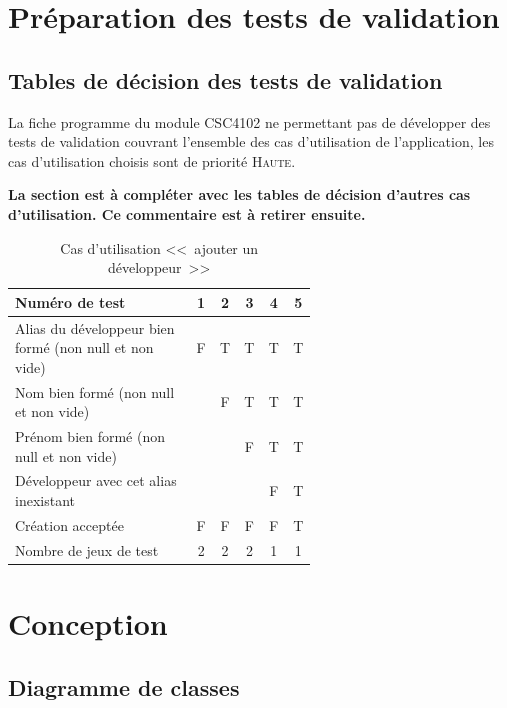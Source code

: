 \documentclass[11pt,article]{article}
\newcommand{\nullvalue}{\textsf{null}\xspace}
\begin{document}
\newpage

\section{Préparation des tests de validation}

\subsection{Tables de décision des tests de validation}

La fiche programme du module CSC4102 ne permettant pas de développer
des tests de validation couvrant l'ensemble des cas d'utilisation de
l'application, les cas d'utilisation choisis sont de
priorité \textsc{Haute}.

\bigskip

{\noindent\color{red}\textbf{La section est à compléter avec les
    tables de décision d'autres cas d'utilisation. Ce commentaire est
    à retirer ensuite.}}

\begin{table}[htbp!]
\begin{tabular}{|p{0.6\linewidth}|c|c|c|c|c|}
\hline
Numéro de test
&1&2&3&4&5\\
\hline
\hline
Alias du développeur bien formé (non \nullvalue et non vide)
&F&T&T&T&T\\
\hline
Nom bien formé (non \nullvalue et non vide)
& &F&T&T&T\\
\hline
Prénom bien formé (non \nullvalue et non vide)
& & &F&T&T\\
\hline
Développeur avec cet alias inexistant
& & & &F&T\\
\hline
\hline
Création acceptée
&F&F&F&F&T\\
\hline
\hline
Nombre de jeux de test 
&2&2&2&1&1\\
\hline
\end{tabular}
\caption{Cas d'utilisation <<~ajouter un développeur~>>}
\end{table}

\newpage

\section{Conception}

\subsection{Diagramme de classes}
\end{document}
